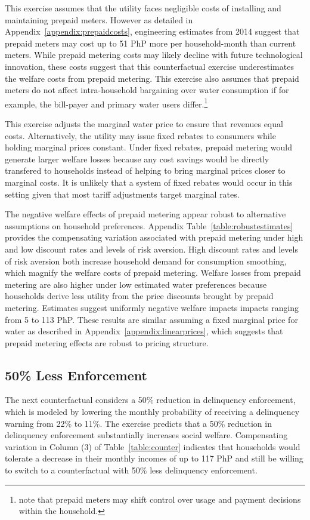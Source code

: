\documentclass[12pt]{article}
\begin{document}
This exercise assumes that the utility faces negligible costs of installing and maintaining prepaid meters.  However as detailed in Appendix~\ref{appendix:prepaidcosts}, engineering estimates from 2014 suggest that prepaid meters may cost up to 51 PhP more per household-month than current meters.  While prepaid metering costs may likely decline with future technological innovation, these costs suggest that this counterfactual exercise underestimates the welfare costs from prepaid metering.  This exercise also assumes that prepaid meters do not affect intra-household bargaining over water consumption if for example, the bill-payer and primary water users differ.\footnote{\cite{jack2020charging} note that prepaid meters may shift control over usage and payment decisions within the household.}

This exercise adjusts the marginal water price to ensure that revenues equal costs.  Alternatively, the utility may issue fixed rebates to consumers while holding marginal prices constant.  Under fixed rebates, prepaid metering would generate larger welfare losses because any cost savings would be directly transfered to households instead of helping to bring marginal prices closer to marginal costs.  It is unlikely that a system of fixed rebates would occur in this setting given that most tariff adjustments target marginal rates.

The negative welfare effects of prepaid metering appear robust to alternative assumptions on household preferences.  Appendix Table~\ref{table:robustestimates} provides the compensating variation associated with prepaid metering under high and low discount rates and levels of risk aversion.  High discount rates and levels of risk aversion both increase household demand for consumption smoothing, which magnify the welfare costs of prepaid metering.  Welfare losses from prepaid metering are also higher under low estimated water preferences because households derive less utility from the price discounts brought by prepaid metering.  Estimates suggest uniformly negative welfare impacts impacts ranging from 5 to 113 PhP.  These results are similar assuming a fixed marginal price for water as described in Appendix~\ref{appendix:linearprices}, which suggests that prepaid metering effects are robust to pricing structure.

\subsection{50\% Less Enforcement}
The next counterfactual considers a 50\% reduction in delinquency enforcement, which is modeled by lowering the monthly probability of receiving a delinquency warning from 22\% to 11\%.  The exercise predicts that a 50\% reduction in delinquency enforcement substantially increases social welfare.  Compensating variation in Column (3) of Table~\ref{table:counter} indicates that households would tolerate a decrease in their monthly incomes of up to 117 PhP and still be willing to switch to a counterfactual with 50\% less delinquency enforcement.  
\end{document}
